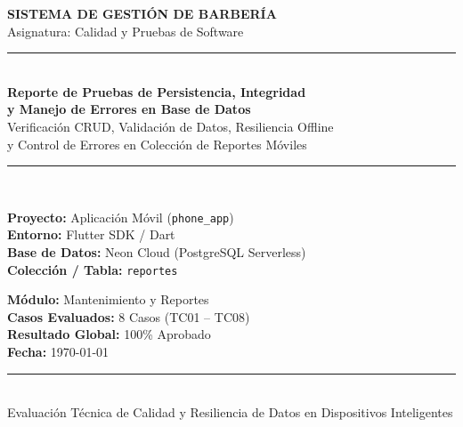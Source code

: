 \documentclass[11pt,a4paper]{article}
\begin{document}

\begin{titlepage}
    \centering
    \vspace*{1.5cm}
    
    {\Large \textbf{SISTEMA DE GESTIÓN DE BARBERÍA}}\\[0.3cm]
    {\large Asignatura: Calidad y Pruebas de Software}\\[1.5cm]
    
    \rule{\linewidth}{1.2pt}\\[0.5cm]
    {\LARGE \bfseries Reporte de Pruebas de Persistencia, Integridad\\ y Manejo de Errores en Base de Datos}\\[0.4cm]
    {\large Verificación CRUD, Validación de Datos, Resiliencia Offline\\ y Control de Errores en Colección de Reportes Móviles}\\[0.5cm]
    \rule{\linewidth}{1.2pt}\\[2.0cm]
    
    \begin{minipage}{0.48\textwidth}
        \textbf{Proyecto:} Aplicación Móvil (\texttt{phone\_app})\\
        \textbf{Entorno:} Flutter SDK / Dart\\
        \textbf{Base de Datos:} Neon Cloud (PostgreSQL Serverless)\\
        \textbf{Colección / Tabla:} \texttt{reportes}
    \end{minipage}
    \hfill
    \begin{minipage}{0.45\textwidth}
        \flushright
        \textbf{Módulo:} Mantenimiento y Reportes\\
        \textbf{Casos Evaluados:} 8 Casos (TC01 -- TC08)\\
        \textbf{Resultado Global:} 100\% Aprobado\\
        \textbf{Fecha:} \today
    \end{minipage}
    
    \vfill
    
    \rule{0.6\linewidth}{0.6pt}\\[0.3cm]
    {\small Evaluación Técnica de Calidad y Resiliencia de Datos en Dispositivos Inteligentes}
    \vspace*{1.0cm}
\end{titlepage}
\end{document}
